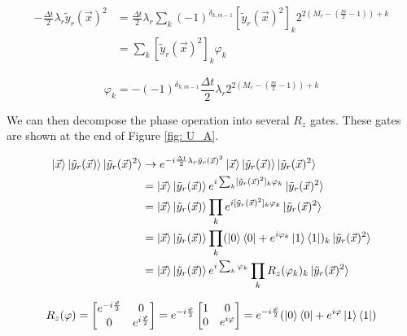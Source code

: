 \begin{equation}
    \begin{split}
        -\frac{\Delta t}{2}\lambda_r\tilde{y}_r(\vec{x})^2 &= \frac{\Delta t}{2}\lambda_r\sum_k (-1)^{\delta_{k, m - 1}}[\tilde{y}_r(\vec{x})^2]_k2^{2(M_r - (\frac{m}{2} - 1)) + k} \\
        &= \sum_k [\tilde{y}_r(\vec{x})^2]_k\varphi_k
    \end{split}
    \label{eq: phase}
\end{equation}

\begin{equation}
    \varphi_k = -(-1)^{\delta_{k, m - 1}}\frac{\Delta t}{2}\lambda_r2^{2(M_r - (\frac{m}{2} - 1)) + k}
    \label{eq: varphi}
\end{equation}

We can then decompose the phase operation into several $R_z$ gates. These gates are shown at the end of Figure \ref{fig: U_A}.

\begin{equation}
    \begin{split}
        \ket{\vec{x}}\ket{\tilde{y}_r(\vec{x})}\ket{\tilde{y}_r(\vec{x})^2} &\rightarrow e^{-i\frac{\Delta t}{2}\lambda_r\tilde{y}_r(\vec{x})^2}\ket{\vec{x}}\ket{\tilde{y}_r(\vec{x})}\ket{\tilde{y}_r(\vec{x})^2} \\
        &= \ket{\vec{x}}\ket{\tilde{y}_r(\vec{x})}e^{i\sum_k [\tilde{y}_r(\vec{x})^2]_k\varphi_k}\ket{\tilde{y}_r(\vec{x})^2} \\
        &= \ket{\vec{x}}\ket{\tilde{y}_r(\vec{x})}\prod_k e^{i[\tilde{y}_r(\vec{x})^2]_k\varphi_k}\ket{\tilde{y}_r(\vec{x})^2} \\
        &= \ket{\vec{x}}\ket{\tilde{y}_r(\vec{x})}\prod_k (\ket{0}\bra{0} + e^{i\varphi_k}\ket{1}\bra{1})_k \ket{\tilde{y}_r(\vec{x})^2} \\
        &= \ket{\vec{x}}\ket{\tilde{y}_r(\vec{x})}e^{i\sum_k \varphi_k}\prod_k R_z(\varphi_k)_k \ket{\tilde{y}_r(\vec{x})^2}
    \end{split}
\end{equation}

\begin{equation}
    R_z(\varphi) = \begin{bmatrix}
        e^{-i\frac{\varphi}{2}} & 0 \\ 0 & e^{i\frac{\varphi}{2}}
    \end{bmatrix} = e^{-i\frac{\varphi}{2}}\begin{bmatrix}
        1 & 0 \\ 0 & e^{i\varphi}
    \end{bmatrix} = e^{-i\frac{\varphi}{2}}(\ket{0}\bra{0} + e^{i\varphi}\ket{1}\bra{1})
\end{equation}

